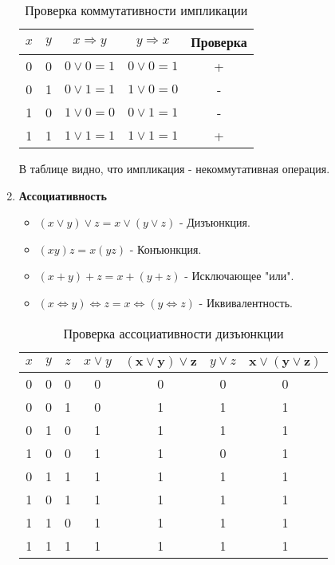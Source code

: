 \documentclass[a4paper,12pt]{article}
\begin{document}
\begin{enumerate}
        \begin{table}[ht]
            \centering
            \begin{tabular}{|c|c|c|c|c|}
                \hline
                $x$ & $y$ & $x\Longrightarrow y$ & $y \Longrightarrow x$ & Проверка \\ \hline
                0 & 0 & $0\vee 0=1$ & $0\vee 0=1$ & + \\ \hline
                0 & 1 & $0\vee 1=1$ & $1\vee 0=0$ & - \\ \hline
                1 & 0 & $1\vee 0=0$ & $0\vee 1=1$ & - \\ \hline
                1 & 1 & $1\vee 1=1$ & $1\vee 1=1$ & + \\ \hline
            \end{tabular}
            \caption{Проверка коммутативности импликации}
        \end{table}

        В таблице видно, что импликация - некоммутативная операция.

        \item \textbf{Ассоциативность}
        \begin{itemize}
            \item $(x\vee y)\vee z= x\vee (y\vee z)$ - Дизъюнкция.
            \item $(xy)z=x(yz)$ - Конъюнкция.
            \item $(x+y)+z=x+(y+z)$ - Исключающее "или".
            \item $(x \Longleftrightarrow y)\Longleftrightarrow z = x\Longleftrightarrow (y \Longleftrightarrow z) $ - Иквивалентность.
        \end{itemize}

        \begin{table}[ht]
            \centering
            \begin{tabular}{|c|c|c|c|c|c|c|}
                \hline
                $x$ & $y$ & $z$ & $x\vee y$ & $\boldsymbol{(x\vee y)\vee z}$& $y\vee z$ & $\boldsymbol{x\vee (y\vee z)}$  \\ \hline
                0 & 0 & 0 & 0 & 0 & 0 & 0 \\ \hline
                0 & 0 & 1 & 0 & 1 & 1 & 1 \\ \hline
                0 & 1 & 0 & 1 & 1 & 1 & 1 \\ \hline
                1 & 0 & 0 & 1 & 1 & 0 & 1 \\ \hline
                0 & 1 & 1 & 1 & 1 & 1 & 1 \\ \hline
                1 & 0 & 1 & 1 & 1 & 1 & 1 \\ \hline
                1 & 1 & 0 & 1 & 1 & 1 & 1 \\ \hline
                1 & 1 & 1 & 1 & 1 & 1 & 1 \\ \hline
            \end{tabular}
            \caption{Проверка ассоциативности дизъюнкции}
        \end{table}


\end{enumerate}
\end{document}
